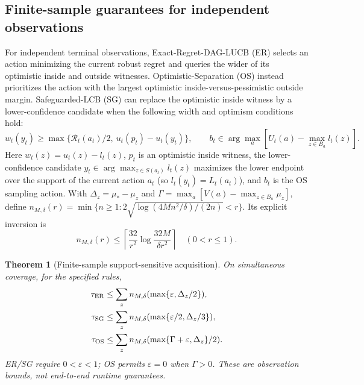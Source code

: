 \documentclass{article}
\theoremstyle{plain}
\newtheorem{theorem}{Theorem}[section]
\theoremstyle{definition}
\begin{document}
\subsection{Finite-sample guarantees for independent observations}
\label{app:independent-acquisition}
For independent terminal observations, Exact-Regret-DAG-LUCB (ER) selects an action minimizing the current robust regret and queries the wider of its optimistic inside and outside witnesses. Optimistic-Separation (OS) instead prioritizes the action with the largest optimistic inside-versus-pessimistic outside margin. Safeguarded-LCB (SG) can replace the optimistic inside witness by a lower-confidence candidate when the following width and optimism conditions hold:
\begin{equation}
 w_t(y_t)\ge\max\{\mathcal R_t(a_t)/2,\ u_t(p_t)-u_t(y_t)\},\qquad
 b_t\in\arg\max_a[U_t(a)-\max_{z\in B_a}l_t(z)].
 \label{eq:safeguard-gate}
\end{equation}
Here $w_t(z)=u_t(z)-l_t(z)$, $p_t$ is an optimistic inside witness, the lower-confidence candidate $y_t\in\arg\max_{z\in S(a_t)}l_t(z)$ maximizes the lower endpoint over the support of the current action $a_t$ (so $l_t(y_t)=L_t(a_t)$), and $b_t$ is the OS sampling action. With $\Delta_z=\mu_*-\mu_z$ and $\Gamma=\max_a[V(a)-\max_{z\in B_a}\mu_z]$, define $n_{M,\delta}(r)=\min\{n\ge1:2\sqrt{\log(4Mn^2/\delta)/(2n)}<r\}$. Its explicit inversion is
\begin{equation}
 n_{M,\delta}(r)\le\left\lceil\frac{32}{r^2}\log\frac{32M}{\delta r^2}\right\rceil\quad(0<r\le1).
 \label{eq:active-inversion}
\end{equation}
\begin{theorem}[Finite-sample support-sensitive acquisition]\label{thm:active-er}\label{prop:active-hybrid}\label{thm:active-os}
On simultaneous coverage, for the specified rules,
\begin{equation}
 \begin{aligned}
 \tau_{\rm ER}&\le\sum_z n_{M,\delta}(\max\{\varepsilon,\Delta_z/2\}),\\
 \tau_{\rm SG}&\le\sum_z n_{M,\delta}(\max\{\varepsilon/2,\Delta_z/3\}),\\
 \tau_{\rm OS}&\le\sum_z n_{M,\delta}(\max\{\Gamma+\varepsilon,\Delta_z\}/2).
 \end{aligned}
 \label{eq:active-er-bound}
\end{equation}
ER/SG require $0<\varepsilon<1$; OS permits $\varepsilon=0$ when $\Gamma>0$. These are observation bounds, not end-to-end runtime guarantees.
\end{theorem}
\end{document}
